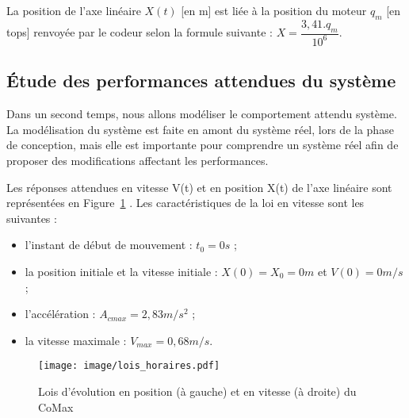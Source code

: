 \vspace{5mm}
La position de l'axe linéaire $X(t)$ [en m] est liée à la position du moteur $q_m$ [en tops] renvoyée par le codeur selon la formule suivante : $X = \dfrac{3,41.q_m}{10^6}$. 

\vspace{5mm}

\vspace{5mm}

\subsection{Étude des performances attendues du système}
Dans un second temps, nous allons modéliser le comportement attendu système. La modélisation du système est faite en amont du système réel, lors de la phase de conception, mais elle est importante pour comprendre un système réel afin de proposer des modifications affectant les performances.

Les réponses attendues en vitesse V(t) et en position X(t) de l’axe linéaire sont représentées en Figure~\ref{lois_horaires} . Les caractéristiques de la loi en vitesse sont les suivantes :
\begin{itemize}
\item l’instant de début de mouvement : $t_0=0 s$ ;
\item la position initiale et la vitesse initiale : $X(0)=X_0=0 m$ et $V(0)=0 m/s$;
\item l’accélération : $A_{cmax}=2,83 m/s^2$ ;
\item la vitesse maximale : $V_{max}=0,68 m/s$.
\end{itemize}

\begin{figure}[!h]
\centering
\texttt{[image: image/lois\_horaires.pdf]}
\caption{Lois d'évolution en position (à gauche) et en vitesse (à droite) du CoMax}
\label{lois_horaires}
\end{figure}

